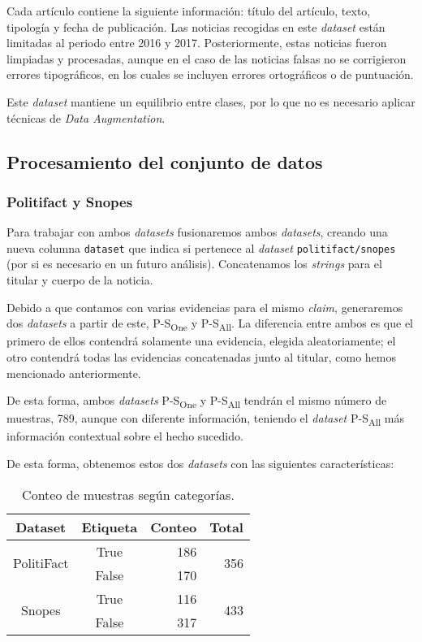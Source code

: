 Cada artículo contiene la siguiente información: título del artículo, texto, tipología y fecha de publicación. Las noticias recogidas en este \textit{dataset} están limitadas al periodo entre 2016 y 2017. Posteriormente, estas noticias fueron limpiadas y procesadas, aunque en el caso de las noticias falsas no se corrigieron errores tipográficos, en los cuales se incluyen errores ortográficos o de puntuación. 

Este \textit{dataset} mantiene un equilibrio entre clases, por lo que no es necesario aplicar técnicas de \textit{Data Augmentation}. 

\subsection{Procesamiento del conjunto de datos}

\subsubsection{Politifact y Snopes}

Para trabajar con ambos \textit{datasets} fusionaremos ambos \textit{datasets}, creando una nueva columna \texttt{dataset} que indica si pertenece al \textit{dataset} \texttt{politifact/snopes} (por si es necesario en un futuro análisis). Concatenamos los \textit{strings} para el titular y cuerpo de la noticia.

Debido a que contamos con varias evidencias para el mismo \textit{claim}, generaremos dos \textit{datasets} a partir de este, {P-S}\textsubscript{One} y {P-S}\textsubscript{All}. La diferencia entre ambos es que el primero de ellos contendrá solamente una evidencia, elegida aleatoriamente; el otro contendrá todas las evidencias concatenadas junto al titular, como hemos mencionado anteriormente.

De esta forma, ambos \textit{datasets} {P-S}\textsubscript{One} y {P-S}\textsubscript{All} tendrán el mismo número de muestras, 789, aunque con diferente información, teniendo el \textit{dataset} {P-S}\textsubscript{All} más información contextual sobre el hecho sucedido.

De esta forma, obtenemos estos dos \textit{datasets} con las siguientes características:

\begin{table}[htb]
    \centering
    \begin{tabular}{ccrr}
        \hline
        \textbf{Dataset} & \textbf{Etiqueta} & \multicolumn{1}{c}{\textbf{Conteo}} & \multicolumn{1}{c}{\textbf{Total}} \\\hline
        \multirow{2}{*}{PolitiFact} & True & 186 & \multirow{2}{*}{356} \\
         & False & 170 &  \\ \hline
        \multirow{2}{*}{Snopes} & True & 116 & \multirow{2}{*}{433} \\
         & False & 317 & \\\hline
    \end{tabular}
    \caption{Conteo de muestras según categorías.}
    \label{tab:sp-new}
\end{table}

